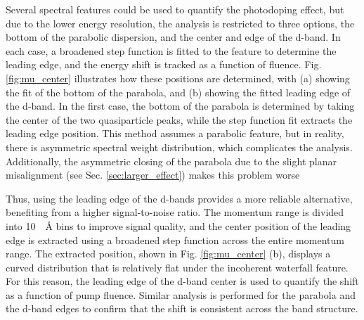 Several spectral features could be used to quantify the photodoping effect, but due to the lower energy resolution, the analysis is restricted to three options, the bottom of the parabolic dispersion, and the center and edge of the  d-band.
In each case, a broadened step function is fitted to the feature to determine the leading edge, and the energy shift is tracked as a function of fluence.
Fig. \ref{fig:mu_center} illustrates how these positions are determined, with (a) showing the fit of the bottom of the parabola, and (b) showing the fitted leading edge of the  d-band.
In the first case, the bottom of the parabola is determined by taking the center of the two quasiparticle peaks, while the step function fit extracts the leading edge position.
This method assumes a parabolic feature, but in reality, there is asymmetric spectral weight distribution, which complicates the analysis.
Additionally, the asymmetric closing of the parabola due to the slight planar misalignment (see Sec. \ref{sec:larger_effect}) makes this problem worse

Thus, using the leading edge of the  d-bands provides a more reliable alternative, benefiting from a higher signal-to-noise ratio.
The momentum range is divided into \qty{10}{\per\angstrom} bins to improve signal quality, and the center position of the leading edge is extracted using a broadened step function across the entire momentum range.
The extracted position, shown in Fig. \ref{fig:mu_center} (b), displays a curved distribution that is relatively flat under the incoherent waterfall feature.
For this reason, the leading edge of the  d-band center is used to quantify the shift as a function of pump fluence.
Similar analysis is performed for the parabola and the d-band edges to confirm that the shift is consistent across the band structure.

